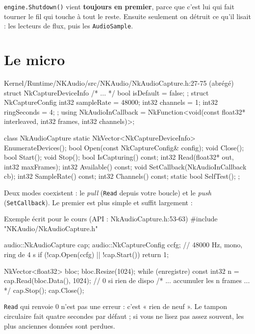 \begin{nkretenir}
\texttt{engine.Shutdown()} vient \textbf{toujours en premier}, parce que c'est
lui qui fait tourner le fil qui touche à tout le reste. Ensuite seulement on
détruit ce qu'il lisait : les lecteurs de flux, puis les \texttt{AudioSample}.
\end{nkretenir}

\section{Le micro}

\begin{nkcode}{Kernel/Runtime/NKAudio/src/NKAudio/NkAudioCapture.h:27-75 (abrégé)}
    struct NkCaptureDeviceInfo { /* ... */ bool isDefault = false; };
    struct NkCaptureConfig {
            int32 sampleRate = 48000;  int32 channels = 1;  int32 ringSeconds = 4;
    };
    using NkAudioInCallback = NkFunction<void(const float32* interleaved, int32 frames, int32 channels)>;

    class NkAudioCapture {
            static NkVector<NkCaptureDeviceInfo> EnumerateDevices();
            bool Open(const NkCaptureConfig& config);  void Close();
            bool Start();  void Stop();  bool IsCapturing() const;
            int32 Read(float32* out, int32 maxFrames);
            int32 Available() const;
            void SetCallback(NkAudioInCallback cb);
            int32 SampleRate() const;  int32 Channels() const;
            static bool SelfTest();
    };
\end{nkcode}

Deux modes coexistent : le \emph{pull} (\texttt{Read} depuis votre boucle) et le
\emph{push} (\texttt{SetCallback}). Le premier est plus simple et suffit
largement :

\begin{nkcode}{Exemple écrit pour le cours (API : NkAudioCapture.h:53-63)}
#include "NKAudio/NkAudioCapture.h"

audio::NkAudioCapture cap;
audio::NkCaptureConfig ccfg;      // 48000 Hz, mono, ring de 4 s
if (!cap.Open(ccfg) || !cap.Start())
    return 1;

NkVector<float32> bloc; bloc.Resize(1024);
while (enregistre) {
    const int32 n = cap.Read(bloc.Data(), 1024);   // 0 si rien de dispo
    /* ... accumuler les n frames ... */
}
cap.Stop();
cap.Close();
\end{nkcode}

\texttt{Read} qui renvoie 0 n'est pas une erreur : c'est « rien de neuf ». Le
tampon circulaire fait quatre secondes par défaut ; si vous ne lisez pas assez
souvent, les plus anciennes données sont perdues.

